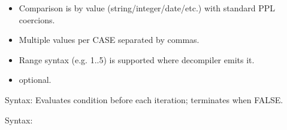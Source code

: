 \documentclass[letterpaper,10pt,english]{sphinxmanual}
\begin{document}
\begin{description}
\begin{sphinxVerbatim}[commandchars=\\\{\}]
   
     \PYG{p}{[} \PYG{p}{]}
    \PYG{p}{[} 
        \PYG{p}{]}
    \PYG{p}{[}
        \PYG{p}{]}
\end{sphinxVerbatim}
\begin{description}
\begin{itemize}
\item {} 
\sphinxAtStartPar
Comparison is by value (string/integer/date/etc.) with standard PPL coercions.

\item {} 
\sphinxAtStartPar
Multiple values per CASE separated by commas.

\item {} 
\sphinxAtStartPar
Range syntax (e.g. 1..5) is supported where decompiler emits it.

\item {} 
\sphinxAtStartPar
{} optional.

\end{itemize}

\end{description}

\sphinxAtStartPar
Syntax: 
Evaluates condition before each iteration; terminates when FALSE.

\sphinxAtStartPar
Syntax:

\begin{sphinxVerbatim}[commandchars=\\\{\}]
   
\end{sphinxVerbatim}


\end{description}
\end{document}
